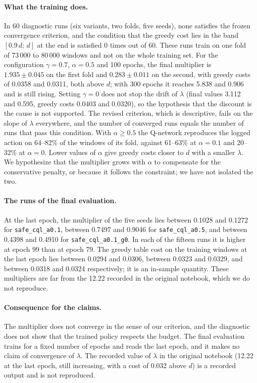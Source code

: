 \paragraph{What the training does.}
In 60 diagnostic runs (six variants, two folds, five seeds), none satisfies the frozen convergence criterion, and the condition that the greedy cost lies in the band $[0.9\,d;\,d]$ at the end is satisfied 0 times out of 60.%
These runs train on one fold of 73\,000 to 80\,000 windows and not on the whole training set.%
For the configuration $\gamma=0.7$, $\alpha=0.5$ and 100 epochs, the final multiplier is $1.935\pm0.045$ on the first fold and $0.283\pm0.011$ on the second, with greedy costs of 0.0358 and 0.0311, both above $d$; with 300 epochs it reaches 5.838 and 0.906 and is still rising.%
Setting $\gamma=0$ does not stop the drift of $\lambda$ (final values 3.112 and 0.595, greedy costs 0.0403 and 0.0320), so the hypothesis that the discount is the cause is not supported.%
The revised criterion, which is descriptive, fails on the slope of $\lambda$ everywhere, and the number of converged runs equals the number of runs that pass this condition.%
With $\alpha\ge0.5$ the Q-network reproduces the logged action on 64--82\% of the windows of its fold, against 61--63\% at $\alpha=0.1$ and 20--32\% at $\alpha=0$.%
Lower values of $\alpha$ give greedy costs closer to $d$ with a smaller $\lambda$.%
We hypothesize that the multiplier grows with $\alpha$ to compensate for the conservative penalty, or because it follows the constraint; we have not isolated the two.%

\paragraph{The runs of the final evaluation.}
At the last epoch, the multiplier of the five seeds lies between 0.1028 and 0.1272 for \texttt{safe\_cql\_a0.1}, between 0.7497 and 0.9046 for \texttt{safe\_cql\_a0.5}, and between 0.4398 and 0.4910 for \texttt{safe\_cql\_a0.1\_g0}.%
In each of the fifteen runs it is higher at epoch 99 than at epoch 79.%
The greedy table cost on the training windows at the last epoch lies between 0.0294 and 0.0306, between 0.0323 and 0.0329, and between 0.0318 and 0.0324 respectively; it is an in-sample quantity.%
These multipliers are far from the 12.22 recorded in the original notebook, which we do not reproduce.%

\paragraph{Consequence for the claims.}
The multiplier does not converge in the sense of our criterion, and the diagnostic does not show that the trained policy respects the budget.%
The final evaluation trains for a fixed number of epochs and reads the last epoch, and it makes no claim of convergence of $\lambda$.%
The recorded value of $\lambda$ in the original notebook (12.22 at the last epoch, still increasing, with a cost of 0.032 above $d$) is a recorded output and is not reproduced.%
